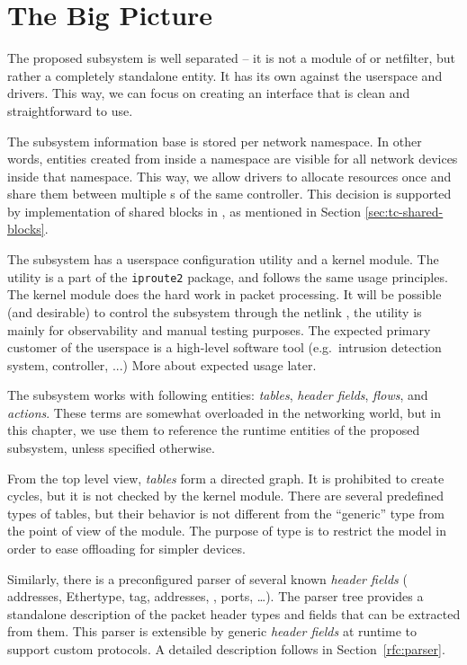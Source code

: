 
\section{The Big Picture}

The proposed subsystem is well separated -- it is not a module of
 or netfilter, but rather a completely standalone entity. It has its
own  against the userspace and drivers. This way, we can focus on creating
an interface that is clean and straightforward to use.

The subsystem information base is stored per network namespace. In other
words, entities created from inside a namespace are visible for all network devices
inside that namespace. This way, we allow drivers to allocate resources once and
share them between multiple \netdev s of the same controller. This decision
is supported by implementation of shared blocks in , as mentioned in
Section \ref{sec:tc-shared-blocks}.

The subsystem has a userspace configuration utility and a kernel module.
The utility is a part of the \texttt{iproute2} package, and follows
the same usage principles. The kernel module does the hard work in packet
processing. It will be possible (and desirable) to control the subsystem
through the netlink , the utility is mainly for observability and manual testing
purposes. The expected primary customer of the userspace  is a high-level
software tool (e.g.\ intrusion detection system,  controller, ...) More
about expected usage later.

The subsystem works with following entities: \emph{tables}, \emph{header
fields}, \emph{flows}, and \emph{actions}. These terms are somewhat overloaded in
the networking world, but in this chapter, we use them to reference the runtime
entities of the proposed subsystem, unless specified otherwise.

From the top level view, \emph{tables} form a directed graph. It
is prohibited to create cycles, but it is not checked by the kernel
module. There are several predefined types of tables, but their
behavior is not different from the ``generic'' type from the point of
view of the module. The purpose of type is to restrict the model in order to
ease offloading for simpler devices.

Similarly, there is a preconfigured parser of several known \emph{header fields}
( addresses, Ethertype,  tag,  addresses, , ports,
\dots). The parser tree provides a standalone
description of the packet header types and fields that can be extracted from them. This
parser is extensible by generic \emph{header fields} at runtime to support
custom protocols. A detailed description follows in Section~\ref{rfc:parser}.

